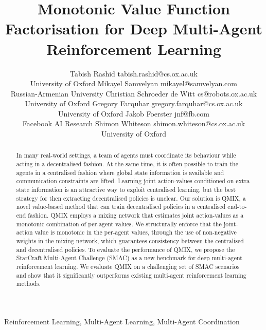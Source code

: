 \documentclass[twoside,11pt]{article}
\begin{document}
\title{Monotonic Value Function Factorisation for Deep Multi-Agent Reinforcement Learning}

\author{\name Tabish Rashid \email tabish.rashid@cs.ox.ac.uk \\
       \addr University of Oxford
       \AND
       \name Mikayel Samvelyan \email mikayel@samvelyan.com \\
       \addr Russian-Armenian University
       \AND
       \name Christian Schroeder de Witt \email cs@robots.ox.ac.uk \\
       \addr University of Oxford
       \AND
       \name Gregory Farquhar \email gregory.farquhar@cs.ox.ac.uk \\
       \addr University of Oxford
        \AND
       \name Jakob Foerster \email jnf@fb.com\\
       \addr Facebook AI Research
        \AND
       \name Shimon Whiteson \email shimon.whiteson@cs.ox.ac.uk \\
       \addr University of Oxford
   }

\newcommand{\customfootnotetext}[2]{{\renewcommand{\thefootnote}{#1}\footnotetext[0]{#2}}}

\customfootnotetext{}{Equal contribution.}


\maketitle
\begin{abstract}
\label{sec:abstract}

In many real-world settings, a team of agents must coordinate its behaviour  
while acting in a decentralised fashion. At the same time, it is often possible to 
train the agents in a centralised fashion
where global state information is available and communication constraints are lifted. 
Learning joint action-values conditioned on extra state information is 
an attractive way to exploit centralised learning, but the best strategy for 
then extracting decentralised policies is unclear.
Our solution is QMIX, a novel value-based method that can train decentralised policies in a centralised end-to-end fashion. 
QMIX employs a mixing network that estimates joint action-values as a monotonic combination of per-agent values.
We structurally enforce that the joint-action value is monotonic in the 
per-agent values, through the use of non-negative weights in the mixing network, which 
guarantees consistency between the 
centralised and decentralised policies.
To evaluate the performance of QMIX, we propose the StarCraft Multi-Agent Challenge (SMAC) as a new benchmark for deep multi-agent reinforcement learning.
We evaluate QMIX on a challenging set of SMAC scenarios and show that it significantly outperforms existing multi-agent reinforcement learning methods.

\end{abstract} 
\begin{keywords}
  Reinforcement Learning, Multi-Agent Learning, Multi-Agent Coordination
\end{keywords}
\end{document}
